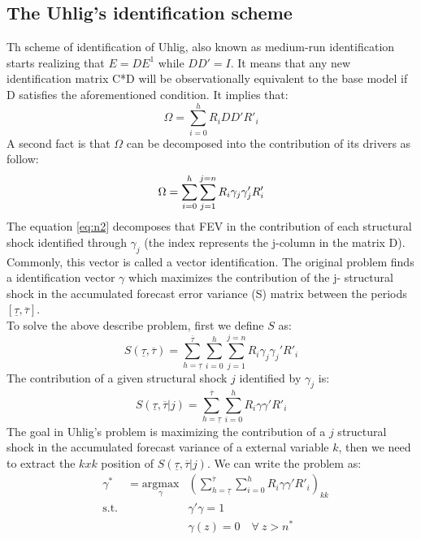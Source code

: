 \documentclass[12pt, a4paper]{article}
\begin{document}
\subsection{The Uhlig's identification scheme}
Th scheme of identification of Uhlig, also known as medium-run identification starts realizing that $E = D E^1$ while $DD' = I$. It means that any new identification matrix C*D will be observationally equivalent to the base model if D satisfies the aforementioned condition. It implies that:
\begin{equation*}
	 \Omega = \sum_{i=0}^h R_{i}D D' R'_{i}
\end{equation*}
A second fact is that $\Omega$ can be decomposed into the contribution of  its drivers as follow:
\begin{equation}{\label{eq:n2}}
	 \Omega = \sum_{i=0}^h \sum_{j=1}^{j=n} R_{i}\gamma_j \gamma_j' R'_{i}
\end{equation}
The equation \ref{eq:n2} decomposes that FEV in the contribution of each structural shock identified through $\gamma_j$ (the index represents the j-column in the matrix D). Commonly, this vector is called a vector identification. The original problem finds a identification vector $\gamma$ which maximizes the contribution of the j- structural shock in the accumulated forecast error variance (S) matrix between the periods $[\underline{\tau}, \overline{\tau}]$.\\
To solve the above describe problem, first we define $S$ as:
\begin{equation}
	 S(\underline{\tau},\overline{\tau}) =  \sum_{h = \underline{\tau}}^{\overline{\tau}}\sum_{i=0}^h \sum_{j=1}^{j=n} R_{i}\gamma_j \gamma_j' R'_{i}
\end{equation}
The contribution of a given structural shock $j$ identified by $\gamma_j$ is:
\begin{equation}
S(\underline{\tau},\overline{\tau}|j) =  \sum_{h = \underline{\tau}}^{\overline{\tau}}\sum_{i=0}^h R_{i}\gamma \gamma' R'_{i}
\end{equation}
The goal in Uhlig's problem is maximizing the contribution of a $j$ structural shock in the accumulated forecast variance of a external variable $k$, then we need to extract the $kxk$ position of $S(\underline{\tau},\overline{\tau}|j)$. We can write the problem as:
\begin{equation}\label{eq:n1}
\begin{aligned}
& \gamma^* &= \underset{\gamma}{\text{argmax}}
& \left(\sum_{h = \underline{\tau}}^{\overline{\tau}}\sum_{i=0}^h R_{i}\gamma \gamma' R'_{i} \right)_{kk}\\
& \text{s.t.}
&  & \gamma' \gamma = 1 \\
&  & & \gamma(z)  = 0 \quad \forall \ z>n^*
\end{aligned}
\end{equation}
\end{document}
